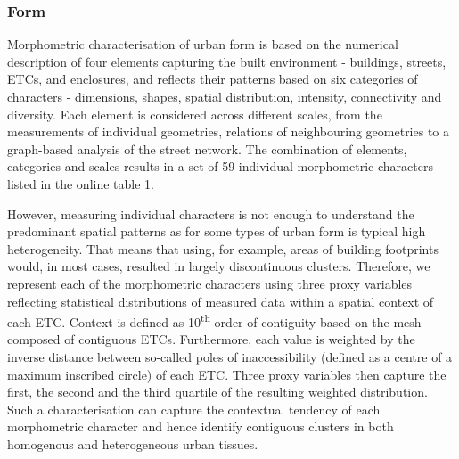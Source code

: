 \subsubsection*{Form}
Morphometric characterisation of urban form is based on the numerical description
of four elements capturing the built environment - buildings, streets, ETCs, and
enclosures, and reflects their patterns based on six categories of characters - dimensions, shapes, spatial
distribution, intensity, connectivity and diversity\cite{fleischmann2020a}. Each element is considered across
different scales, from the measurements of individual geometries, relations of
neighbouring geometries to a graph-based analysis of the street network. The combination of
elements, categories and scales results in a set of 59 individual morphometric
characters listed in the online table 1.


However, measuring individual characters is not enough to understand the predominant
spatial patterns as for some types of urban form is typical high heterogeneity. That
means that using, for example, areas of building footprints would, in most cases, resulted
in largely discontinuous clusters. Therefore, we represent each of the
morphometric characters using three proxy variables reflecting statistical distributions
of measured data within a spatial context of each ETC. Context is defined as
10\textsuperscript{th}
order of contiguity based on the mesh composed of contiguous ETCs. Furthermore, each
value is weighted by the inverse distance between so-called poles of inaccessibility
(defined as a centre of a maximum inscribed circle) of each ETC. Three proxy variables
then capture the first, the second and the third quartile of the resulting weighted
distribution. Such a characterisation can capture the contextual tendency of each
morphometric character and hence identify contiguous clusters in both homogenous and
heterogeneous urban tissues.

